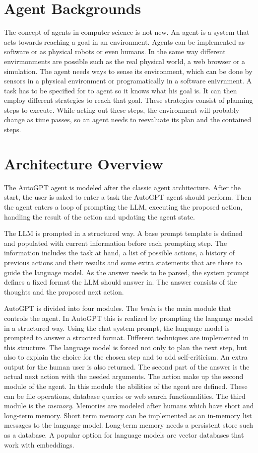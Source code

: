 \documentclass[english, version-2022-01]{uzl-thesis}
\begin{document}
\section{Agent Backgrounds}

The concept of agents in computer science is not new.
An agent is a system that acts towards reaching a goal in an environment.
Agents can be implemented as software or as physical robots or even humans.
In the same way different envirmonments are possible such as the real physical world, a web browser or a simulation.
The agent needs ways to sense its environment, which can be done by sensors in a physical environment or programatically in a software enivrnment. A task has to be specified for to agent so it knows what his goal is.
It can then employ different strategies to reach that goal. These strategies consist of planning steps to execute.
While acting out these steps, the environment will probably change as time passes, so an agent needs to reevaluate its plan and the contained steps.

\section{Architecture Overview}

The AutoGPT agent is modeled after the classic agent architecture.
After the start, the user is asked to enter a task the AutoGPT agent should perform.
Then the agent enters a loop of prompting the LLM, executing the proposed action, handling the result of the action and updating the agent state.

The LLM is prompted in a structured way.
A base prompt template is defined and populated with current information before each prompting step.
The information includes the task at hand, a list of possible actions, a history of previous actions and their results and some extra statements that are there to guide the language model.
As the answer needs to be parsed, the system prompt defines a fixed format the LLM should answer in.
The answer consists of the thoughts and the proposed next action.


AutoGPT is divided into four modules. The \textit{brain} is the main module that controls the agent.
In AutoGPT this is realized by prompting the language model in a structured way.
Using the chat system prompt, the language model is prompted to answer a structred format.
Different techniques are implemented in this structure.
The language model is forced not only to plan the next step, but also to explain the choice for the chosen step and to add self-criticism. An extra output for the human user is also returned.
The second part of the answer is the actual next action with the needed arguments.
The action make up the second module of the agent. In this module the abilities of the agent are defined.
These can be file operations, database queries or web search functionalities. The third module is the \textit{memory}.
Memories are modeled after humans which have short and long-term memory.
Short term memory can be implemented as an in-memory list messages to the language model.
Long-term memory needs a persistent store such as a database.
A popular option for language models are vector databases that work with embeddings.
\end{document}
